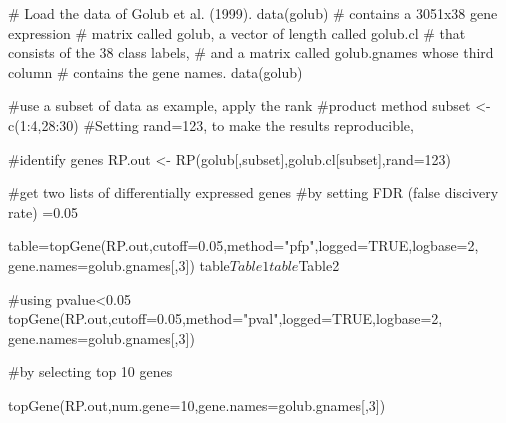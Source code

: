\begin{SeeAlso}\relax
{}   
 
\end{SeeAlso}
\begin{Examples}
\begin{ExampleCode}

      # Load the data of Golub et al. (1999). data(golub) 
      # contains a 3051x38 gene expression
      # matrix called golub, a vector of length called golub.cl 
      # that consists of the 38 class labels,
      # and a matrix called golub.gnames whose third column 
      # contains the gene names.
      data(golub)

      #use a subset of data as example, apply the rank 
      #product method
      subset <- c(1:4,28:30)
      #Setting rand=123, to make the results reproducible,

      #identify genes 
      RP.out <- RP(golub[,subset],golub.cl[subset],rand=123)  

      #get two lists of differentially expressed genes 
      #by setting FDR (false discivery rate) =0.05

      table=topGene(RP.out,cutoff=0.05,method="pfp",logged=TRUE,logbase=2,
                   gene.names=golub.gnames[,3])
      table$Table1
      table$Table2

      #using pvalue<0.05
      topGene(RP.out,cutoff=0.05,method="pval",logged=TRUE,logbase=2,
                   gene.names=golub.gnames[,3])

      #by selecting top 10 genes

      topGene(RP.out,num.gene=10,gene.names=golub.gnames[,3])

\end{ExampleCode}
\end{Examples}

